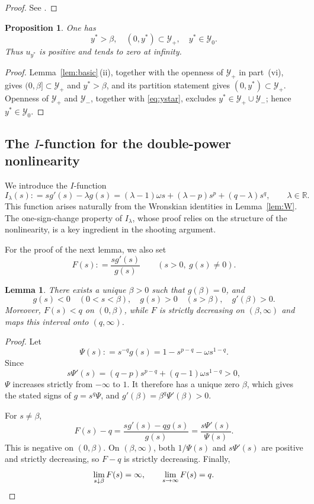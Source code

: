 \documentclass[12pt, a4paper, reqno]{amsart}
\numberwithin{equation}{section}
\newtheorem{proposition}[theorem]{Proposition}
\newtheorem{lemma}[theorem]{Lemma}
\theoremstyle{definition}
\theoremstyle{remark}
\newcommand{\R}{\mathbb R}
\newcommand{\ce}{\mathrel{\mathop:}=}
\begin{document}
\begin{proof}
See \cite[Lemma~7.1]{LN20}.
\end{proof}

\begin{proposition}\label{prop:first}
One has
\[
  y^*>\beta,
  \quad
  (0,y^*)\subset \mathcal Y_+,
  \quad
  y^*\in \mathcal Y_0.
\]
Thus $u_{y^*}$ is positive and tends to zero at infinity.
\end{proposition}

\begin{proof}
Lemma~\ref{lem:basic}\,\textup{(ii)}, together with the openness of
$\mathcal Y_+$ in part~\textup{(vi)}, gives $(0,\beta]\subset \mathcal Y_+$ and $y^*>\beta$,
and its partition statement gives $(0,y^*)\subset \mathcal Y_+$. Openness of
$\mathcal Y_+$ and $\mathcal Y_-$, together with \eqref{eq:ystar}, excludes
$y^*\in \mathcal Y_+\cup \mathcal Y_-$; hence $y^*\in \mathcal Y_0$.
\end{proof}

\subsection{\texorpdfstring{The $I$-function for the double-power nonlinearity}{The I-function for the double-power nonlinearity}}

We introduce the $I$-function
\begin{equation*}
  I_\lambda(s)\ce s g'(s)-\lambda g(s)
  =(\lambda-1)\omega s+(\lambda-p)s^p+(q-\lambda)s^q,
  \qquad \lambda\in\R.
\end{equation*}
This function arises naturally from the Wronskian identities in
Lemma~\ref{lem:W}. The one-sign-change property of $I_\lambda$, whose proof
relies on the structure of the nonlinearity, is a key ingredient in the
shooting argument.

For the proof of the next lemma, we also set
\[
  F(s)\ce \frac{s g'(s)}{g(s)}
  \qquad (s>0,\ g(s)\ne0).
\]

\begin{lemma}\label{lem:F}
There exists a unique $\beta>0$ such that $g(\beta)=0$, and
\[
  g(s)<0\quad(0<s<\beta),
  \quad
  g(s)>0\quad(s>\beta),
  \quad
  g'(\beta)>0.
\]
Moreover, $F(s)<q$ on $(0,\beta)$, while $F$ is strictly decreasing
on $(\beta,\infty)$ and maps this interval onto $(q,\infty)$.
\end{lemma}

\begin{proof}
Let
\[
  \Psi(s)\ce s^{-q}g(s)=1-s^{p-q}-\omega s^{1-q}.
\]
Since
\[
  s\Psi'(s)
  =(q-p)s^{p-q}+(q-1)\omega s^{1-q}>0,
\]
$\Psi$ increases strictly from $-\infty$ to $1$. It therefore has a
unique zero $\beta$, which gives the stated signs of $g=s^q\Psi$, and
$g'(\beta)=\beta^q\Psi'(\beta)>0$.

For $s\ne\beta$,
\[
  F(s)-q
  =\frac{s g'(s)-qg(s)}{g(s)}
  =\frac{s\Psi'(s)}{\Psi(s)}.
\]
This is negative on $(0,\beta)$. On $(\beta,\infty)$, both
$1/\Psi(s)$ and $s\Psi'(s)$ are positive and strictly decreasing, so
$F-q$ is strictly decreasing. Finally,
\[
  \lim_{s\downarrow\beta}F(s)=\infty,
  \qquad
  \lim_{s\to\infty}F(s)=q.
  \qedhere
\]
\end{proof}
\end{document}
